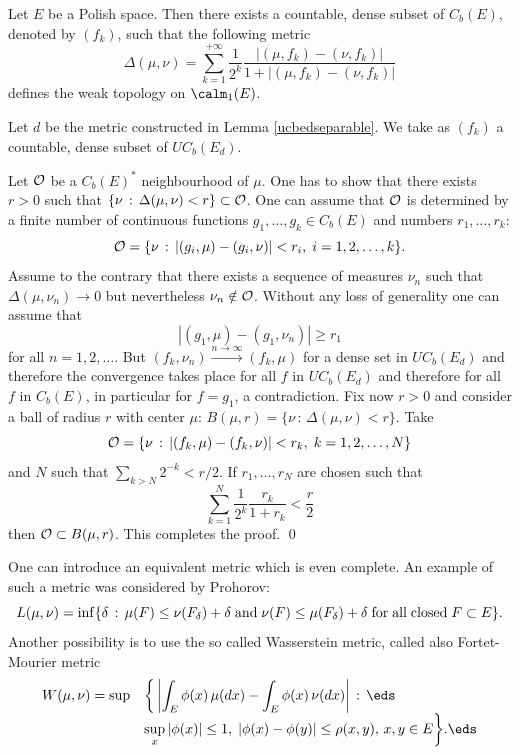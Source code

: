 \documentclass[preprint]{imsart}
\def\ds{\displaystyle}
\begin{document}
{\begin{Proposition}
Let $E$ be a Polish space. Then there
exists a
countable, dense subset of $C_b(E)$, denoted by
$(f_k)$, such that
the following metric
$$
\Delta (\mu,\nu)=
\sum_{k=1}^{+\infty}\frac{1}{2^k}
\frac{|(\mu,f_k)-(\nu ,f_k)|}{1+|(\mu,f_k)-(\nu ,f_k)|}
$$
defines the weak topology on  $\calm_1(E)$.
\end{Proposition}

Let $d$ be the metric constructed in
Lemma \ref{ucbedseparable}. We take as
$(f_k)$ a
countable, dense subset of $UC_b(E_d)$.



Let $ {\cal O} $ be a $C_b(E)^*$ neighbourhood of
$\mu$. One has to show that there exists $r>0$ such
that $\{\nu\, :\, \Delta (\mu,\nu)<r\}\subset {\cal O}
$. One can assume that ${\cal O} $ is determined by a
finite number of continuous functions
$g_1,\ldots,g_k\in C_b(E)$ and numbers
$r_1,\ldots,r_k$:
$$
{\cal O} =\{ \nu\, :\, |(g_i,\mu)-(g_i,\nu )|<r_i,\;
i=1,2,\ldots ,k\}.
$$
Assume to the contrary that there exists a sequence of
measures $\nu_n$ such that $\Delta (\mu,\nu_n)\to 0$
but nevertheless $\nu_n\notin {\cal O}$. Without any
loss of generality one can assume that
$$
|(g_1,\mu)-(g_1,\nu_n )|\geq r_1
$$
for all $n=1,2,\ldots$. But
$(f_k,\nu_n)\stackrel{n\to\infty}{\longrightarrow}
(f_k,\mu)$ for a dense set in $UC_b(E_d)$ and therefore
the convergence takes place for all $f$ in $UC_b(E_d)$
and therefore for all $f$ in $C_b(E)$, in particular
for $f=g_1$, a contradiction. Fix now $r>0$ and
consider a ball of radius $r$ with center $\mu$:
$
B(\mu,r)=\{ \nu\, :\, \Delta (\mu,\nu)<r\}.
$
Take
$$
{\cal O} =\{ \nu\, :\, |(f_k,\mu)-(f_k,\nu )|<r_k,\;
k=1,2,\ldots ,N\}
$$
and $N$ such that $\sum_{k>N}2^{-k}< r/2$. If
$r_1,\ldots,r_N$ are chosen such that
$$
\sum_{k=1}^N \frac{1}{2^k}\frac{r_k}{1+r_k}<
\frac{r}{2}
$$
then ${\cal O}\subset B(\mu,r)$. This completes the
proof. \qed

\begin{Remark}\begin{em}
One can introduce an equivalent metric which is even
complete. An example of such a metric was considered by
Prohorov:
$$
L(\mu,\nu)=\inf \{\delta\, :\, \mu(F)\leq
\nu(F_\delta)+\delta \; {\rm and}\;
\nu(F)\leq
\mu(F_\delta)+\delta\; {\rm for \; all \; closed}\;
F\subset E\}.
$$
Another possibility is to use the so called Wasserstein
metric, called also Fortet-Mourier metric
$$\begin{array}{ll}
W(\mu,\nu)=\sup&\ds
\bigg\{\left| \int_E\phi(x)\,\mu(dx)
- \int_E\phi(x)\,\nu(dx)\right|\, :\,
\eds\\&\ds
\sup_x|\phi(x)|\leq 1,\;
|\phi(x)-\phi(y)|\leq \rho(x,y),\,x,y\in E\bigg\}.
\eds  \end{array}
$$
\end{em}
\end{Remark}


}
\end{document}

